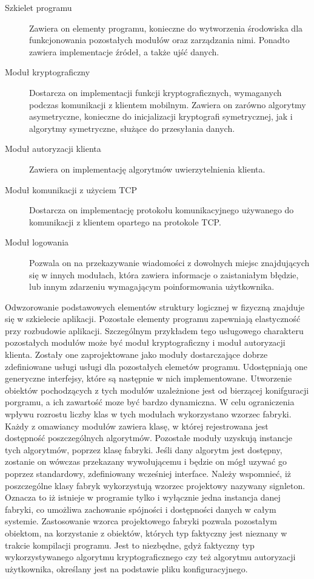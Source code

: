 \begin{description}
\item[Szkielet programu] Zawiera on elementy programu, konieczne do
  wytworzenia środowiska dla funkcjonowania pozostałych modułów oraz
  zarządzania nimi. Ponadto zawiera implementacje źródeł, a także ujść
  danych.
\item[Moduł kryptograficzny] Dostarcza on implementacji funkcji
  kryptograficznych, wymaganych podczas komunikacji z klientem
  mobilnym. Zawiera on zarówno algorytmy asymetryczne, konieczne do
  inicjalizacji kryptografi symetrycznej, jak i algorytmy symetryczne,
  służące do przesyłania danych.
\item[Moduł autoryzacji klienta] Zawiera on implementację algorytmów
  uwierzytelnienia klienta.
\item[Moduł komunikacji z użyciem TCP] Dostarcza on implementację
  protokołu komunikacyjnego używanego do komunikacji z klientem
  opartego na protokole TCP.
\item[Moduł logowania] Pozwala on na przekazywanie wiadomości z
  dowolnych miejsc znajdujących się w innych modułach, która zawiera
  informacje o zaistaniałym błędzie, lub innym zdarzeniu wymagającym
  poinformowania użytkownika.
\end{description}


Odwzorowanie podstawowych elementów struktury logicznej w fizyczną
znajduje się w szkielecie aplikacji. Pozostałe elementy programu
zapewniają elastyczność przy rozbudowie aplikacji. Szczególnym
przykładem tego usługowego charakteru pozostałych modułów może być
moduł kryptograficzny i moduł autoryzacji klienta. Zostały one
zaprojektowane jako moduły dostarczające dobrze zdefiniowane usługi
usługi dla pozostałych elemetów programu. Udostępniają one generyczne
interfejsy, które są następnie w nich implementowane. Utworzenie
obiektów pochodzących z tych modułów uzależnione jest od bierzącej
konifguracji porgramu, a ich zawartość moze być bardzo dynamiczna. W
celu ograniczenia wpływu rozrostu liczby klas w tych modułach
wykorzystano wzorzec fabryki. Każdy z omawiancy modułów zawiera klasę,
w której rejestrowana jest dostępność poszczególnych
algorytmów. Pozostałe moduły uzyskują instancje tych algorytmów,
poprzez klasę fabryki. Jeśli dany algorytm jest dostępny, zostanie on
wówczas przekazany wywołującemu i będzie on mógł uzywać go poprzez
standardowy, zdefiniowany wcześniej interface. Należy wspomnieć, iż
poszczególne klasy fabryk wykorzystują wzorzec projektowy nazywany
signleton. Oznacza to iż istnieje w programie tylko i wyłącznie jedna
instancja danej fabryki, co umożliwa zachowanie spójności i
dostępności danych w całym systemie. Zastosowanie wzorca projektowego
fabryki pozwala pozostałym obiektom, na korzystanie z obiektów,
których typ faktyczny jest nieznany w trakcie kompilacji
programu. Jest to niezbędne, gdyż faktyczny typ wykorzystywanego
algorytmu kryptograficznego czy też algorytmu autoryzacji użytkownika,
określany jest na podstawie pliku konfiguracyjnego.

